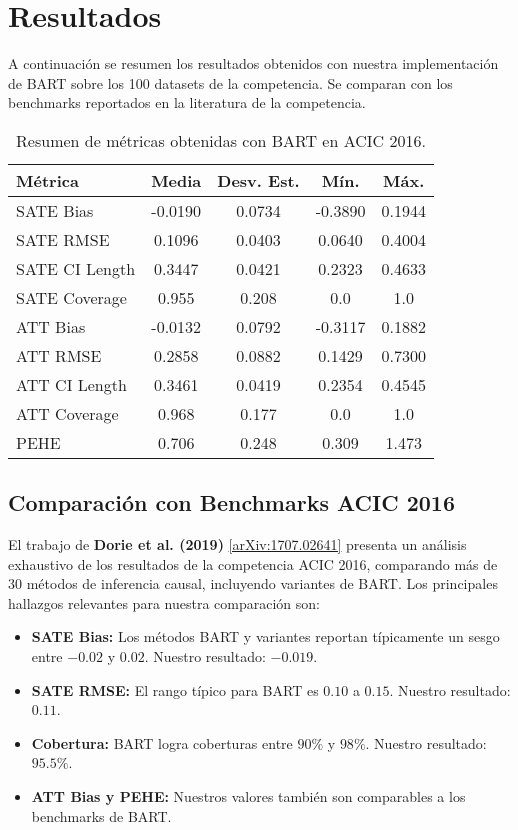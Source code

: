 \documentclass[a4paper,12pt]{article}
\begin{document}
\section{Resultados}
A continuación se resumen los resultados obtenidos con nuestra implementación de BART sobre los 100 datasets de la competencia. Se comparan con los benchmarks reportados en la literatura de la competencia.

\begin{table}[h!]
\centering
\begin{tabular}{lcccc}
\toprule
Métrica & Media & Desv. Est. & Mín. & Máx. \\
\midrule
SATE Bias & -0.0190 & 0.0734 & -0.3890 & 0.1944 \\
SATE RMSE & 0.1096 & 0.0403 & 0.0640 & 0.4004 \\
SATE CI Length & 0.3447 & 0.0421 & 0.2323 & 0.4633 \\
SATE Coverage & 0.955 & 0.208 & 0.0 & 1.0 \\
ATT Bias & -0.0132 & 0.0792 & -0.3117 & 0.1882 \\
ATT RMSE & 0.2858 & 0.0882 & 0.1429 & 0.7300 \\
ATT CI Length & 0.3461 & 0.0419 & 0.2354 & 0.4545 \\
ATT Coverage & 0.968 & 0.177 & 0.0 & 1.0 \\
PEHE & 0.706 & 0.248 & 0.309 & 1.473 \\
\bottomrule
\end{tabular}
\caption{Resumen de métricas obtenidas con BART en ACIC 2016.}
\end{table}

\subsection{Comparación con Benchmarks ACIC 2016}
El trabajo de \textbf{Dorie et al. (2019)} \cite{dorie2019automated} \href{https://arxiv.org/abs/1707.02641}{[arXiv:1707.02641]} presenta un análisis exhaustivo de los resultados de la competencia ACIC 2016, comparando más de 30 métodos de inferencia causal, incluyendo variantes de BART. Los principales hallazgos relevantes para nuestra comparación son:

\begin{itemize}
    \item \textbf{SATE Bias:} Los métodos BART y variantes reportan típicamente un sesgo entre $-0.02$ y $0.02$. Nuestro resultado: $-0.019$.
    \item \textbf{SATE RMSE:} El rango típico para BART es $0.10$ a $0.15$. Nuestro resultado: $0.11$.
    \item \textbf{Cobertura:} BART logra coberturas entre $90\%$ y $98\%$. Nuestro resultado: $95.5\%$.
    \item \textbf{ATT Bias y PEHE:} Nuestros valores también son comparables a los benchmarks de BART.
\end{itemize}
\end{document}
